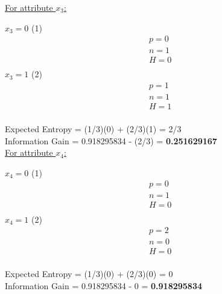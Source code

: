 \documentclass[8pt, fullpage,letterpaper]{article}
\begin{document}
\begin{enumerate}
\begin{enumerate}
\begin{enumerate}
\begin{enumerate}
\begin{itemize}
						\underline {For attribute $x_3$:} 
							\vspace{-5pt}
							\begin{multicols}{2}
								$x_3=0$ (1)
			 						\begin{align*}
									    	& p = 0\\
										& n = 1 \\
									    	& H = 0\\
								      \end{align*}
								$x_3=1$ (2)
			 						\begin{align*}
									    	& p = 1\\
										& n = 1 \\
									    	& H = 1\\
								      \end{align*}
							\end{multicols}
							\vspace{-20pt}
							Expected Entropy = (1/3)(0) + (2/3)(1) = 2/3\\
							Information Gain = 0.918295834 - (2/3) = {\bf 0.251629167}\\

						\underline {For attribute $x_4$:} 
							\vspace{-5pt}
							\begin{multicols}{2}
								$x_4=0$ (1)
			 						\begin{align*}
									    	& p = 0\\
										& n = 1 \\
									    	& H = 0\\
								      \end{align*}
								$x_4=1$ (2)
			 						\begin{align*}
									    	& p = 2\\
										& n = 0 \\
									    	& H = 0\\
								      \end{align*}
							\end{multicols}
							\vspace{-20pt}
							Expected Entropy = (1/3)(0) + (2/3)(0) = 0\\
							Information Gain = 0.918295834 - 0 = {\bf 0.918295834}\\

					\centerline{}
				\end{itemize}	
			\end{enumerate}


\end{enumerate}
\end{enumerate}
\end{enumerate}
\end{document}

